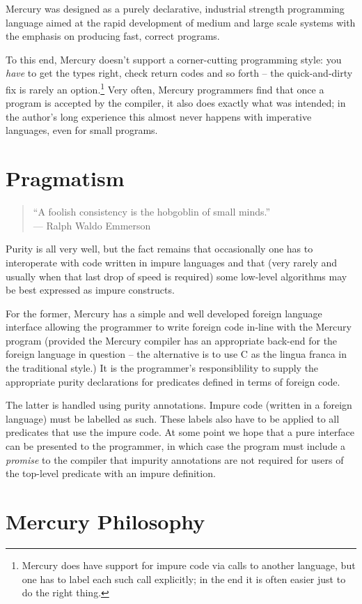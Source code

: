 Mercury was designed as a purely declarative, industrial
strength programming language aimed at the rapid development
of medium and large scale systems with the emphasis on
producing fast, correct programs.

To this end, Mercury doesn't support a corner-cutting
programming style: you \emph{have} to get the types right, check
return codes and so forth -- the quick-and-dirty fix is rarely
an option.\footnote{Mercury does have support for impure code
via calls to another language, but one has to label each such
call explicitly; in the end it is often easier just to do the
right thing.}  Very often, Mercury programmers find that once
a program is accepted by the compiler, it also does exactly
what was intended; in the author's long experience this almost
never happens with imperative languages, even for small
programs.


\section{Pragmatism}

\begin{quote}
``A foolish consistency is the hobgoblin of small minds.'' \\
\hfill --- Ralph Waldo Emmerson
\end{quote}

Purity is all very well, but the fact remains that
occasionally one has to interoperate with code written in
impure languages and that (very rarely and usually when that
last drop of speed is required) some low-level algorithms may
be best expressed as impure constructs.

For the former, Mercury has a simple and well developed
foreign language interface allowing the programmer to write
foreign code in-line with the Mercury program (provided the
Mercury compiler has an appropriate back-end for the foreign
language in question -- the alternative is to use C as the
lingua franca in the traditional style.)  It is the
programmer's responsiblility to supply the appropriate purity
declarations for predicates defined in terms of foreign code.

The latter is handled using purity annotations.  Impure code
(written in a foreign language) must be labelled as such.
These labels also have to be applied to all predicates that
use the impure code.  At some point we hope that a pure
interface can be presented to the programmer, in which case
the program must include a \emph{promise} to the compiler that
impurity annotations are not required for users of the
top-level predicate with an impure definition.

\section{Mercury Philosophy}





